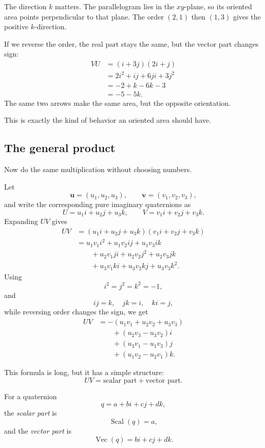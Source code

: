 The direction \(k\) matters.  The parallelogram lies in the \(xy\)-plane, so its oriented
area points perpendicular to that plane.  The order \((2,1)\) then \((1,3)\) gives the
positive \(k\)-direction.

If we reverse the order, the real part stays the same, but the vector part changes sign:
\[
\begin{aligned}
    VU
    &=(i+3j)(2i+j)\\
    &=2i^2+ij+6ji+3j^2\\
    &=-2+k-6k-3\\
    &=-5-5k.
\end{aligned}
\]
The same two arrows make the same area, but the opposite orientation.

This is exactly the kind of behavior an oriented area should have.

\subsection{The general product}

Now do the same multiplication without choosing numbers.

Let
\[
    \mathbf u=(u_1,u_2,u_3),
    \qquad
    \mathbf v=(v_1,v_2,v_3),
\]
and write the corresponding pure imaginary quaternions as
\[
    U=u_1i+u_2j+u_3k,
    \qquad
    V=v_1i+v_2j+v_3k.
\]
Expanding \(UV\) gives
\[
\begin{aligned}
UV
&=(u_1i+u_2j+u_3k)(v_1i+v_2j+v_3k)\\
&=u_1v_1i^2+u_1v_2ij+u_1v_3ik\\
&\qquad
 +u_2v_1ji+u_2v_2j^2+u_2v_3jk\\
&\qquad
 +u_3v_1ki+u_3v_2kj+u_3v_3k^2.
\end{aligned}
\]
Using
\[
    i^2=j^2=k^2=-1,
\]
and
\[
    ij=k,\quad jk=i,\quad ki=j,
\]
while reversing order changes the sign, we get
\[
\boxed{
\begin{aligned}
UV
&=-(u_1v_1+u_2v_2+u_3v_3)\\
&\qquad
 +(u_2v_3-u_3v_2)i\\
&\qquad
 +(u_3v_1-u_1v_3)j\\
&\qquad
 +(u_1v_2-u_2v_1)k.
\end{aligned}
}
\]

This formula is long, but it has a simple structure:
\[
    UV
    =
    \text{scalar part}
    +
    \text{vector part}.
\]

\begin{definition}
For a quaternion
\[
    q=a+bi+cj+dk,
\]
the \emph{scalar part} is
\[
    \operatorname{Scal}(q)=a,
\]
and the \emph{vector part} is
\[
    \operatorname{Vec}(q)=bi+cj+dk.
\]
\end{definition}

